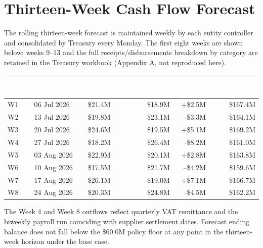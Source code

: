 \documentclass[11pt,a4paper]{scrreprt}
\begin{document}
\section{Thirteen-Week Cash Flow Forecast}

The rolling thirteen-week forecast is maintained weekly by each entity controller and
consolidated by Treasury every Monday. The first eight weeks are shown below; weeks 9--13
and the full receipts/disbursements breakdown by category are retained in the Treasury
workbook (Appendix A, not reproduced here).

\begin{table}[h!]
\centering
\small
\begin{tabularx}{\textwidth}{@{}lXrrrr@{}}
\toprule
\rowcolor{treasurynavy}
\textcolor{white}{\bfseries Week} & \textcolor{white}{\bfseries Period Ending} &
\textcolor{white}{\bfseries Receipts} & \textcolor{white}{\bfseries Disbursements} &
\textcolor{white}{\bfseries Net Flow} & \textcolor{white}{\bfseries Ending Balance} \\
\midrule
W1  & 06 Jul 2026 & \$21.4M & \$18.9M & +\$2.5M  & \$167.4M \\
\rowcolor{treasurygray}
W2  & 13 Jul 2026 & \$19.8M & \$23.1M & --\$3.3M & \$164.1M \\
W3  & 20 Jul 2026 & \$24.6M & \$19.5M & +\$5.1M  & \$169.2M \\
\rowcolor{treasurygray}
W4  & 27 Jul 2026 & \$18.2M & \$26.4M & --\$8.2M & \$161.0M \\
W5  & 03 Aug 2026 & \$22.9M & \$20.1M & +\$2.8M  & \$163.8M \\
\rowcolor{treasurygray}
W6  & 10 Aug 2026 & \$17.5M & \$21.7M & --\$4.2M & \$159.6M \\
W7  & 17 Aug 2026 & \$26.1M & \$19.0M & +\$7.1M  & \$166.7M \\
\rowcolor{treasurygray}
W8  & 24 Aug 2026 & \$20.3M & \$24.8M & --\$4.5M & \$162.2M \\
\bottomrule
\end{tabularx}
\end{table}

\noindent The Week 4 and Week 8 outflows reflect quarterly VAT remittance and the
biweekly payroll run coinciding with supplier settlement dates. Forecast ending balance
does not fall below the \$60.0M policy floor at any point in the thirteen-week horizon
under the base case.

\end{document}
